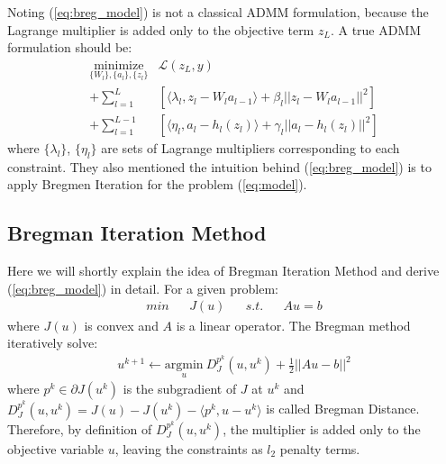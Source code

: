 \documentclass[letterpaper, 10 pt, conference]{ieeeconf}  %
\begin{document}
Noting (\ref{eq:breg_model}) is not a classical ADMM formulation, because the Lagrange multiplier is added only to the objective term $z_L$. A true ADMM formulation should be:
\begin{equation}
\begin{aligned}
\underset{\{W_l\},\{a_l\}, \{z_l\}}{\text{minimize}} & \mathcal{L}(z_L,y) \\
+  \sum_{l=1}^{L}&[\langle \lambda_l, z_l - W_la_{l-1} \rangle + \beta_l||z_l - W_la_{l-1}||^2] \\
+ \sum_{l=1}^{L-1}&[\langle \eta_l, a_l - h_l(z_l) \rangle + \gamma_l||a_l - h_l(z_l)||^2 ]
\label{eq:admm_model}
\end{aligned}
\end{equation}
where $\{\lambda_l\}$, $\{\eta_l\}$ are sets of Lagrange multipliers corresponding to each constraint. They also mentioned the intuition behind (\ref{eq:breg_model}) is to apply Bregmen Iteration \cite{10} for the problem (\ref{eq:model}). 

\subsection{Bregman Iteration Method} \label{breg_method}
Here we will shortly explain the idea of Bregman Iteration Method and derive (\ref{eq:breg_model}) in detail. For a given problem: 
\begin{equation}
\begin{aligned}
min && J(u) && s.t. && Au=b 
\end{aligned}
\end{equation}
where  $J(u)$ is convex and $A$ is a linear operator. The Bregman method iteratively solve:
\begin{equation}
\begin{aligned}
u^{k+1} \leftarrow \underset{u}{\text{argmin}} \: D_J^{p^k}(u, u^k) + {\frac{1}{2}}||Au - b||^2
\label{eq:breg}
\end{aligned} 
\end{equation}
where $p^k \in \partial J(u^k)$ is the subgradient of $J$ at $u^k$ and $D_J^{p^k}(u, u^k) = J(u) - J(u^k) - \langle p^k, u - u^k\rangle $ is called Bregman Distance. Therefore, by definition of $D_J^{p^k}(u, u^k)$, the multiplier is added only to the objective variable $u$, leaving the constraints as $l_2$ penalty terms.
\end{document}
